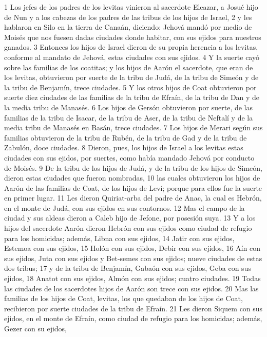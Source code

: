1 Los jefes de los padres de los levitas vinieron al sacerdote Eleazar, a Josué hijo de Nun y a los cabezas de los padres de las tribus de los hijos de Israel,
2 y les hablaron en Silo en la tierra de Canaán, diciendo: Jehová mandó por medio de Moisés que nos fuesen dadas ciudades donde habitar, con sus ejidos para nuestros ganados. 
3 Entonces los hijos de Israel dieron de su propia herencia a los levitas, conforme al mandato de Jehová, estas ciudades con sus ejidos.
4 Y la suerte cayó sobre las familias de los coatitas; y los hijos de Aarón el sacerdote, que eran de los levitas, obtuvieron por suerte de la tribu de Judá, de la tribu de Simeón y de la tribu de Benjamín, trece ciudades.
5 Y los otros hijos de Coat obtuvieron por suerte diez ciudades de las familias de la tribu de Efraín, de la tribu de Dan y de la media tribu de Manasés.
6 Los hijos de Gersón obtuvieron por suerte, de las familias de la tribu de Isacar, de la tribu de Aser, de la tribu de Neftalí y de la media tribu de Manasés en Basán, trece ciudades.
7 Los hijos de Merari según sus familias obtuvieron de la tribu de Rubén, de la tribu de Gad y de la tribu de Zabulón, doce ciudades.
8 Dieron, pues, los hijos de Israel a los levitas estas ciudades con sus ejidos, por suertes, como había mandado Jehová por conducto de Moisés.
9 De la tribu de los hijos de Judá, y de la tribu de los hijos de Simeón, dieron estas ciudades que fueron nombradas,
10 las cuales obtuvieron los hijos de Aarón de las familias de Coat, de los hijos de Leví; porque para ellos fue la suerte en primer lugar.
11 Les dieron Quiriat-arba del padre de Anac, la cual es Hebrón, en el monte de Judá, con sus ejidos en sus contornos.
12 Mas el campo de la ciudad y sus aldeas dieron a Caleb hijo de Jefone, por posesión suya.
13 Y a los hijos del sacerdote Aarón dieron Hebrón con sus ejidos como ciudad de refugio para los homicidas; además, Libna con sus ejidos,
14 Jatir con sus ejidos, Estemoa con sus ejidos,
15 Holón con sus ejidos, Debir con sus ejidos,
16 Aín con sus ejidos, Juta con sus ejidos y Bet-semes con sus ejidos; nueve ciudades de estas dos tribus;
17 y de la tribu de Benjamín, Gabaón con sus ejidos, Geba con sus ejidos,
18 Anatot con sus ejidos, Almón con sus ejidos; cuatro ciudades.
19 Todas las ciudades de los sacerdotes hijos de Aarón son trece con sus ejidos.
20 Mas las familias de los hijos de Coat, levitas, los que quedaban de los hijos de Coat, recibieron por suerte ciudades de la tribu de Efraín.
21 Les dieron Siquem con sus ejidos, en el monte de Efraín, como ciudad de refugio para los homicidas; además, Gezer con su ejidos,
